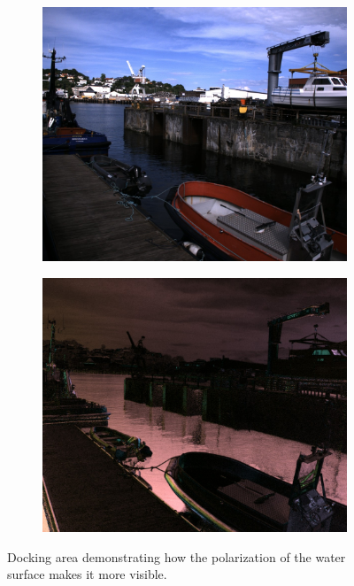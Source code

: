 \begin{figure}[H]
    \begin{subfigure}[T]{.49\textwidth}
        \includegraphics[width=\textwidth]{figures/pictures/img_2790_s0.jpg}
    \end{subfigure} \hfill
    \begin{subfigure}[T]{.49\textwidth}
        \includegraphics[width=\textwidth]{figures/pictures/img_2790_pol.jpg}
    \end{subfigure}
    \caption{Docking area demonstrating how the polarization of the water surface makes it more visible.}
\end{figure}
\vspace{-.5cm}

